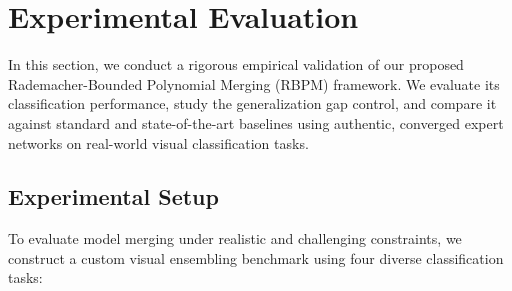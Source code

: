 \section{Experimental Evaluation}
\label{sec:experiments}

In this section, we conduct a rigorous empirical validation of our proposed Rademacher-Bounded Polynomial Merging (RBPM) framework. We evaluate its classification performance, study the generalization gap control, and compare it against standard and state-of-the-art baselines using authentic, converged expert networks on real-world visual classification tasks.

\subsection{Experimental Setup}
To evaluate model merging under realistic and challenging constraints, we construct a custom visual ensembling benchmark using four diverse classification tasks:
